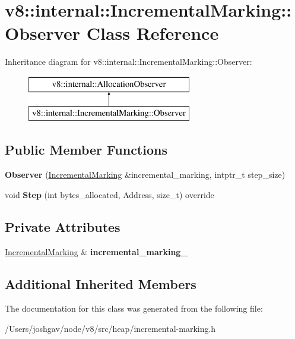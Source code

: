 \hypertarget{classv8_1_1internal_1_1_incremental_marking_1_1_observer}{}\section{v8\+:\+:internal\+:\+:Incremental\+Marking\+:\+:Observer Class Reference}
\label{classv8_1_1internal_1_1_incremental_marking_1_1_observer}
Inheritance diagram for v8\+:\+:internal\+:\+:Incremental\+Marking\+:\+:Observer\+:\begin{figure}[H]
\begin{center}
\leavevmode
\includegraphics[height=2.000000cm]{classv8_1_1internal_1_1_incremental_marking_1_1_observer}
\end{center}
\end{figure}
\subsection*{Public Member Functions}
\begin{DoxyCompactItemize}
\item 
{\bfseries Observer} (\hyperlink{classv8_1_1internal_1_1_incremental_marking}{Incremental\+Marking} \&incremental\+\_\+marking, intptr\+\_\+t step\+\_\+size)\hypertarget{classv8_1_1internal_1_1_incremental_marking_1_1_observer_ae08afd98b7d14bea5b1eee954f7aead6}{}\label{classv8_1_1internal_1_1_incremental_marking_1_1_observer_ae08afd98b7d14bea5b1eee954f7aead6}

\item 
void {\bfseries Step} (int bytes\+\_\+allocated, Address, size\+\_\+t) override\hypertarget{classv8_1_1internal_1_1_incremental_marking_1_1_observer_a7ae9e04db138d0d16e34a596a5f06a7f}{}\label{classv8_1_1internal_1_1_incremental_marking_1_1_observer_a7ae9e04db138d0d16e34a596a5f06a7f}

\end{DoxyCompactItemize}
\subsection*{Private Attributes}
\begin{DoxyCompactItemize}
\item 
\hyperlink{classv8_1_1internal_1_1_incremental_marking}{Incremental\+Marking} \& {\bfseries incremental\+\_\+marking\+\_\+}\hypertarget{classv8_1_1internal_1_1_incremental_marking_1_1_observer_ae6088f23f1752cc5e7a451671084cdb4}{}\label{classv8_1_1internal_1_1_incremental_marking_1_1_observer_ae6088f23f1752cc5e7a451671084cdb4}

\end{DoxyCompactItemize}
\subsection*{Additional Inherited Members}


The documentation for this class was generated from the following file\+:\begin{DoxyCompactItemize}
\item 
/\+Users/joshgav/node/v8/src/heap/incremental-\/marking.\+h\end{DoxyCompactItemize}
